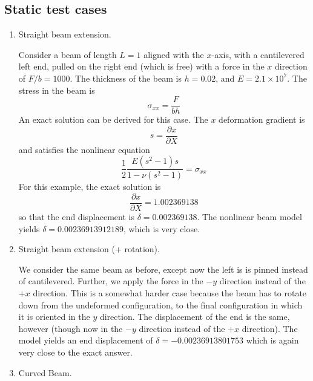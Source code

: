 \documentclass{article}
\begin{document}
\subsection{Static test cases}
\begin{enumerate}
\item Straight beam extension.

Consider a beam of length $L=1$ aligned with the $x$-axis, with a cantilevered left end, pulled on the right end (which is free) with a force in the $x$ direction of $F/b = 1000$.
The thickness of the beam is $h = 0.02$, and $E=2.1 \times 10^7$.
The stress in the beam is 
\[ \sigma_{xx} = \frac{F}{bh} \]
An exact solution can be derived for this case.  
The $x$ deformation gradient is
\[ s = \frac{\partial x}{\partial X} \]
and satisfies the nonlinear equation
\begin{equation} \frac{1}{2} \frac{E(s^2-1)s}{1-\nu(s^2-1)} = \sigma_{xx}  \label{eq:eq9900} \end{equation}
For this example, the exact solution is
\[ \frac{\partial x}{\partial X} = 1.002369138 \]
so that the end displacement is $\delta = 0.002369138$.
The nonlinear beam model yields $\delta = 0.00236913912189$, which is very close.

\item Straight beam extension (+ rotation).

We consider the same beam as before, except now the left is is pinned instead of cantilevered.
Further, we apply the force in the $-y$ direction instead of the $+x$ direction.  
This is a somewhat harder case because the beam has to rotate down from the undeformed configuration, to the final configuration in which it is oriented in the $y$ direction.
The displacement of the end is the same, however (though now in the $-y$ direction instead of the $+x$ direction).
The model yields an end displacement of 
$\delta = -0.00236913801753$
which is again very close to the exact answer.

\item Curved Beam.


\end{enumerate}
\end{document}
